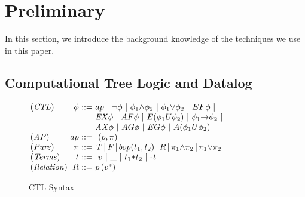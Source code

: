 \section{Preliminary}
In this section, we introduce the background knowledge of the techniques we use in this paper.

\subsection{Computational Tree Logic and Datalog}


\begin{figure}[!b]
{
\centering
\renewcommand{\arraystretch}{1}
$
\arraycolsep=1.6pt
\begin{array}{lrll}
\m{(CTL)}  & \phi &{::=}&   
ap 
{~\mid~} \neg\phi
{~\mid~} \phi_1 {\wedge} \phi_2
{~\mid~} \phi_1 {\vee} \phi_2
{~\mid~} EF\phi 
{~\mid~}  
\\
&&& \m{EX}\phi 
{~\mid~} AF\phi 
{~\mid~} E(\phi_1 {U} \phi_2)
{~\mid~} \phi_1 {\rightarrow} \phi_2 
{~\mid~} 
\\
&&& 
\m{AX}\phi 
{~\mid~} AG\phi 
{~\mid~} EG\phi 
{~\mid~} A(\phi_1 {U} \phi_2) 
\\ 
\m{(AP)}  & ap &{::=}&  \ 
(\nm, \pi)
\\
\m{(Pure)} &    \pi &{::=}&   
{ \m{T}}
{\,\mid\,}  \m{F}
{\,\mid\,} bop(t_1, t_2)
{\,\mid\,} \relation 
{\,\mid\,}   {{\pi_1}}{\wedge}  \pi_2
{\,\mid\,}  {{\pi_1}} {\vee} \pi_2 
\\    
\m{(Terms)} & t  &{::=}&  \ 
v
{~\mid~} \_ 
{~\mid~}  t_1{\text{\ttfamily +}}t_2
{~\mid~}  \text{-}t 
\\
\m{(Relation)}&  \relation &{::=}& 
\nm\,(v^*)
\end{array}$
\caption{CTL Syntax}
\label{fig:Syntax_of_CTL}
}
\end{figure}

